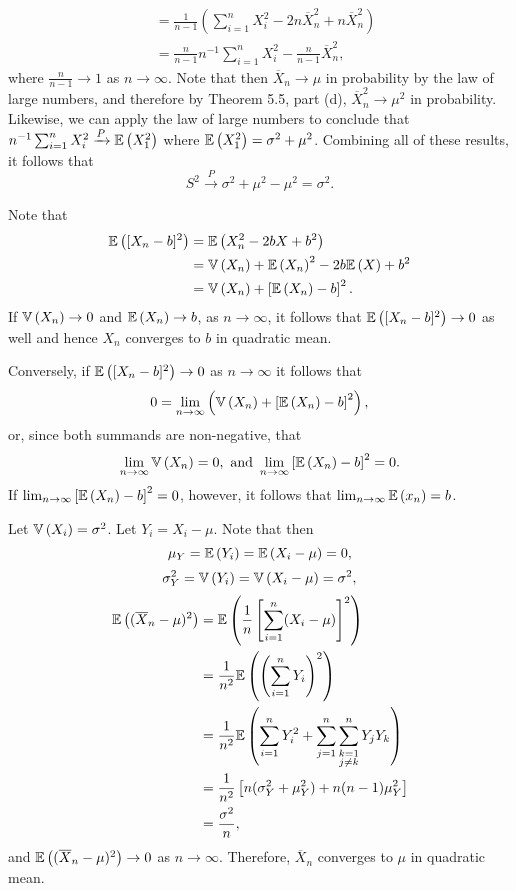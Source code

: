 \begin{ex}
\begin{enumerate}[(a)]
\begin{align*}
             & =\frac{1}{n-1}\left(\sum_{i=1}^nX_i^2-2n\overline{X}_n^2+n\overline{X}_n^2\right) \\
             & =\frac{n}{n-1}n^{-1}\sum_{i=1}^nX_i^2-\frac{n}{n-1}\overline{X}_n^2,
          \end{align*}
          where $\frac{n}{n-1}\to 1$ as $n\to\infty$. Note that then
          $\overline{X}_n\to \mu$ in probability by the law of large numbers,
          and therefore by Theorem 5.5, part (d), $\overline{X}_n^2\to \mu^2$
          in probability. Likewise, we can apply the law of large numbers to
          conclude that $n^{-1}\sum_{i=1}^nX_i^2\xrightarrow{P} \mathbb{E}\left(X_1^2\right)$
          where $\mathbb{E}\left(X_1^2\right)=\sigma^2+\mu^2$. Combining all of these results, it
          follows that
          \[
            S^2\xrightarrow{P}\sigma^2+\mu^2-\mu^2=\sigma^2.
          \]
  \end{enumerate}
\end{ex}

\begin{ex}
  Note that
  \begin{align*}
    \mathbb{E}\left([X_n-b]^2\right)
     & =\mathbb{E}\left(X_n^2-2bX+b^2\right)                   \\
     & =\mathbb{V}\left(X_n\right)+\mathbb{E}\left(X_n\right)^2-2b\mathbb{E}\left(X\right)+b^2     \\
     & =\mathbb{V}\left(X_n\right)+\left[\mathbb{E}\left(X_n\right)-b\right]^2.
  \end{align*}
  If $\mathbb{V}\left(X_n\right)\to 0$ and $\mathbb{E}\left(X_n\right)\to b$, as
  $n\to \infty$, it follows that $\mathbb{E}\left([X_n-b]^2\right)\to 0$ as well and hence
  $X_n$ converges to $b$ in quadratic mean.

  Conversely, if $\mathbb{E}\left([X_n-b]^2\right)\to 0$ as $n\to\infty$ it follows that
  \[
    0=\lim_{n\to\infty}\left(\mathbb{V}\left(X_n\right)+\left[\mathbb{E}\left(X_n\right)-b\right]^2\right),
  \]
  or, since both summands are non-negative, that
  \[
    \lim_{n\to\infty}\mathbb{V}\left(X_n\right)=0,\text{ and }
    \lim_{n\to\infty}\left[\mathbb{E}\left(X_n\right)-b\right]^2=0.
  \]
  If $\lim_{n\to\infty}\left[\mathbb{E}\left(X_n\right)-b\right]^2=0$, however, it follows that
  $\lim_{n\to\infty}\mathbb{E}\left(x_n\right)=b$.
\end{ex}

\begin{ex}
  Let $\mathbb{V}\left(X_i\right)=\sigma^2$. Let $Y_i=X_i-\mu$. Note that then
  \[
    \mu_Y=\mathbb{E}\left(Y_i\right)=\mathbb{E}\left(X_i-\mu\right)=0,
  \]
  \[
    \sigma^2_Y=\mathbb{V}\left(Y_i\right)=\mathbb{V}\left(X_i-\mu\right)=\sigma^2,
  \]
  \begin{align*}
    \mathbb{E}\left((\overline{X}_n-\mu)^2\right)
     & =\mathbb{E}\left(\frac{1}{n}\left[\sum_{i=1}^n(X_i-\mu)\right]^2\right)            \\
     & =\frac{1}{n^2}\mathbb{E}\left(\left(\sum_{i=1}^n Y_i\right)^2\right)               \\
     & =\frac{1}{n^2}\mathbb{E}\left(\sum_{i=1}^n Y_i^2 +
      \sum_{j=1}^n\sum_{\substack{k=1                                  \\ j\neq k}}^n Y_jY_k\right) \\
     & =\frac{1}{n^2}\left[n(\sigma_Y^2+\mu_Y^2)+n(n-1)\mu_Y^2 \right] \\
     & =\frac{\sigma^2}{n},
  \end{align*}
  and $\mathbb{E}\left((\overline{X}_n-\mu)^2\right)\to 0$ as $n\to\infty$. Therefore,
  $\overline{X}_n$ converges to $\mu$ in quadratic mean.
\end{ex}

